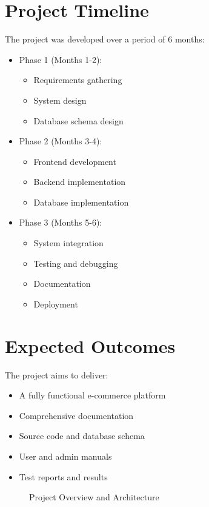 \section{Project Timeline}
The project was developed over a period of 6 months:
\begin{itemize}
    \item Phase 1 (Months 1-2):
    \begin{itemize}
        \item Requirements gathering
        \item System design
        \item Database schema design
    \end{itemize}
    \item Phase 2 (Months 3-4):
    \begin{itemize}
        \item Frontend development
        \item Backend implementation
        \item Database implementation
    \end{itemize}
    \item Phase 3 (Months 5-6):
    \begin{itemize}
        \item System integration
        \item Testing and debugging
        \item Documentation
        \item Deployment
    \end{itemize}
\end{itemize}

\section{Expected Outcomes}
The project aims to deliver:
\begin{itemize}
    \item A fully functional e-commerce platform
    \item Comprehensive documentation
    \item Source code and database schema
    \item User and admin manuals
    \item Test reports and results
\end{itemize}

\begin{figure}[h]
    \centering
    \caption{Project Overview and Architecture}
    \label{fig:project-overview}
\end{figure}

